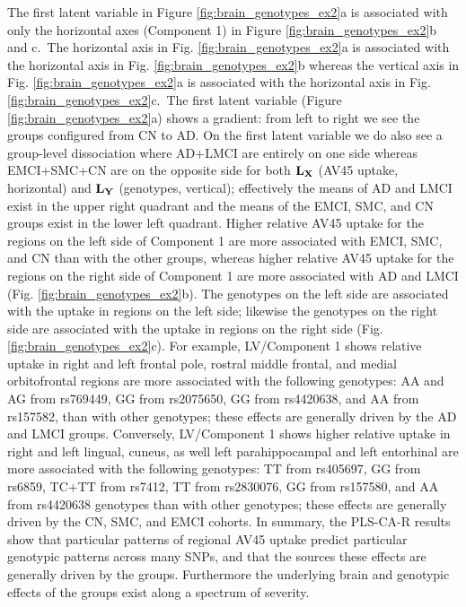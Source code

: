\documentclass[12pt]{article}
\begin{document}
The first latent variable in Figure \ref{fig:brain_genotypes_ex2}a is
associated with only the horizontal axes (Component 1) in Figure
\ref{fig:brain_genotypes_ex2}b and c.~The horizontal axis in Fig.
\ref{fig:brain_genotypes_ex2}a is associated with the horizontal axis in
Fig. \ref{fig:brain_genotypes_ex2}b whereas the vertical axis in Fig.
\ref{fig:brain_genotypes_ex2}a is associated with the horizontal axis in
Fig. \ref{fig:brain_genotypes_ex2}c.~The first latent variable (Figure
\ref{fig:brain_genotypes_ex2}a) shows a gradient: from left to right we
see the groups configured from CN to AD. On the first latent variable we
do also see a group-level dissociation where AD+LMCI are entirely on one
side whereas EMCI+SMC+CN are on the opposite side for both
\({\bf L}_{\bf X}\) (AV45 uptake, horizontal) and \({\bf L}_{\bf Y}\)
(genotypes, vertical); effectively the means of AD and LMCI exist in the
upper right quadrant and the means of the EMCI, SMC, and CN groups exist
in the lower left quadrant. Higher relative AV45 uptake for the regions
on the left side of Component 1 are more associated with EMCI, SMC, and
CN than with the other groups, whereas higher relative AV45 uptake for
the regions on the right side of Component 1 are more associated with AD
and LMCI (Fig. \ref{fig:brain_genotypes_ex2}b). The genotypes on the
left side are associated with the uptake in regions on the left side;
likewise the genotypes on the right side are associated with the uptake
in regions on the right side (Fig. \ref{fig:brain_genotypes_ex2}c). For
example, LV/Component 1 shows relative uptake in right and left frontal
pole, rostral middle frontal, and medial orbitofrontal regions are more
associated with the following genotypes: AA and AG from rs769449, GG
from rs2075650, GG from rs4420638, and AA from rs157582, than with other
genotypes; these effects are generally driven by the AD and LMCI groups.
Conversely, LV/Component 1 shows higher relative uptake in right and
left lingual, cuneus, as well left parahippocampal and left entorhinal
are more associated with the following genotypes: TT from rs405697, GG
from rs6859, TC+TT from rs7412, TT from rs2830076, GG from rs157580, and
AA from rs4420638 genotypes than with other genotypes; these effects are
generally driven by the CN, SMC, and EMCI cohorts. In summary, the
PLS-CA-R results show that particular patterns of regional AV45 uptake
predict particular genotypic patterns across many SNPs, and that the
sources these effects are generally driven by the groups. Furthermore
the underlying brain and genotypic effects of the groups exist along a
spectrum of severity.
\end{document}
